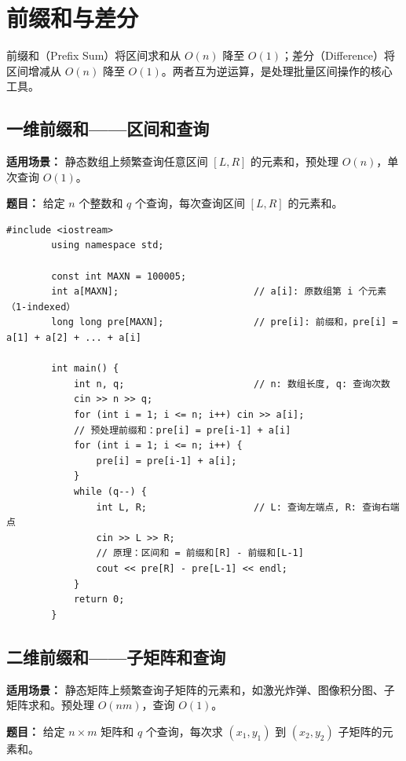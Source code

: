 \documentclass[12pt,a4paper]{ctexart}
\begin{document}
	\newpage
	
	\section{前缀和与差分}
	前缀和（Prefix Sum）将区间求和从 \(O(n)\) 降至 \(O(1)\)；差分（Difference）将区间增减从 \(O(n)\) 降至 \(O(1)\)。两者互为逆运算，是处理批量区间操作的核心工具。
	
	\subsection{一维前缀和——区间和查询}
	\textbf{适用场景：} 静态数组上频繁查询任意区间 \([L,R]\) 的元素和，预处理 \(O(n)\)，单次查询 \(O(1)\)。
	
	\textbf{题目：} 给定 \(n\) 个整数和 \(q\) 个查询，每次查询区间 \([L,R]\) 的元素和。
	
	\begin{lstlisting}[caption={一维前缀和——O(1) 区间和查询}]
		#include <iostream>
		using namespace std;
		
		const int MAXN = 100005;
		int a[MAXN];                        // a[i]: 原数组第 i 个元素（1-indexed）
		long long pre[MAXN];                // pre[i]: 前缀和，pre[i] = a[1] + a[2] + ... + a[i]
		
		int main() {
			int n, q;                       // n: 数组长度, q: 查询次数
			cin >> n >> q;
			for (int i = 1; i <= n; i++) cin >> a[i];
			// 预处理前缀和：pre[i] = pre[i-1] + a[i]
			for (int i = 1; i <= n; i++) {
				pre[i] = pre[i-1] + a[i];
			}
			while (q--) {
				int L, R;                   // L: 查询左端点, R: 查询右端点
				cin >> L >> R;
				// 原理：区间和 = 前缀和[R] - 前缀和[L-1]
				cout << pre[R] - pre[L-1] << endl;
			}
			return 0;
		}
	\end{lstlisting}
	
	\subsection{二维前缀和——子矩阵和查询}
	\textbf{适用场景：} 静态矩阵上频繁查询子矩阵的元素和，如激光炸弹、图像积分图、子矩阵求和。预处理 \(O(nm)\)，查询 \(O(1)\)。
	
	\textbf{题目：} 给定 \(n \times m\) 矩阵和 \(q\) 个查询，每次求 \((x_1,y_1)\) 到 \((x_2,y_2)\) 子矩阵的元素和。
	
\end{document}
